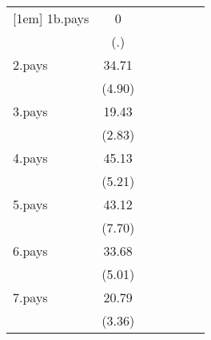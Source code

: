 {\begin{tabular}{l*{6}{c}}
[1em]
1b.pays             &           0         &                     &                     &                     &                     &                     \\
                    &         (.)         &                     &                     &                     &                     &                     \\
[1em]
2.pays              &       34.71\sym{***}&                     &                     &                     &                     &                     \\
                    &      (4.90)         &                     &                     &                     &                     &                     \\
[1em]
3.pays              &       19.43\sym{**} &                     &                     &                     &                     &                     \\
                    &      (2.83)         &                     &                     &                     &                     &                     \\
[1em]
4.pays              &       45.13\sym{***}&                     &                     &                     &                     &                     \\
                    &      (5.21)         &                     &                     &                     &                     &                     \\
[1em]
5.pays              &       43.12\sym{***}&                     &                     &                     &                     &                     \\
                    &      (7.70)         &                     &                     &                     &                     &                     \\
[1em]
6.pays              &       33.68\sym{***}&                     &                     &                     &                     &                     \\
                    &      (5.01)         &                     &                     &                     &                     &                     \\
[1em]
7.pays              &       20.79\sym{***}&                     &                     &                     &                     &                     \\
                    &      (3.36)         &                     &                     &                     &                     &                     \\

\end{tabular}}
